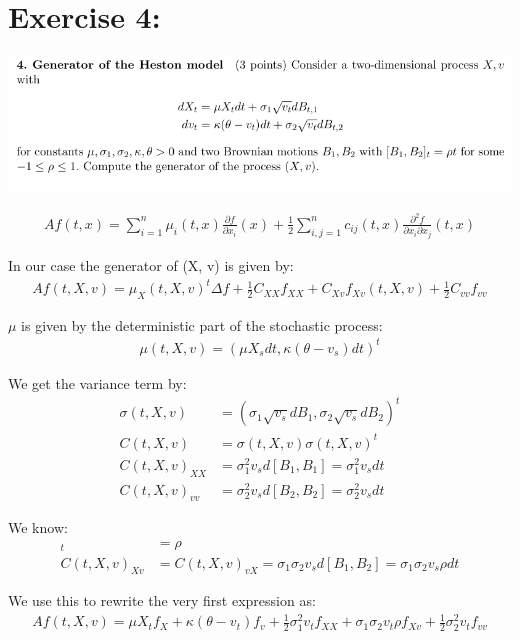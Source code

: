 \documentclass[document.tex]{subfiles}
\begin{document}
\section*{Exercise 4:}


\includegraphics[width=\textwidth]{ex4.png}


\begin{align*}
Af(t,x)=\sum_{i=1}^{n} \mu_i(t,x) \frac{\partial f}{\partial x_i} (x) + \frac{1}{2} \sum_{i,j=1}^n c_{ij} (t,x) 
\frac{\partial^2 f}{\partial x_i \partial x_j} (t,x)
\end{align*}

In our case the generator of (X, v) is given by:
\begin{align*}
Af(t, X, v) = \mu_X(t, X, v)^t \Delta f + \frac{1}{2} C_{XX} f_{XX} + C_{Xv} f_{Xv}(t, X, v) + \frac{1}{2} C_{vv} f_{vv}
\end{align*}

$\mu$ is given by the deterministic part of the stochastic process:
\begin{align*}
\mu(t, X, v) = (\mu X_s dt, \kappa (\theta - v_s) dt)^t
\end{align*}


We get the variance term by:
\begin{align*}
\sigma(t, X, v) &= (\sigma_1 \sqrt{v_s} d B_1, \sigma_2 \sqrt{v_s} d B_2)^t \\
C(t, X, v) &= \sigma(t, X, v) \sigma(t, X, v)^t \\
C(t, X, v)_{XX} &= \sigma_1^2 v_s d [B_1, B_1] = \sigma_1^2 v_s d t \\
C(t, X, v)_{vv} &= \sigma_2^2 v_s d [B_2, B_2] = \sigma_2^2 v_s d t
\end{align*}

We know:
\begin{align*}
	[B_1, B_2]_t &= \rho \\
C(t, X, v)_{Xv} &= C(t, X, v)_{vX} = \sigma_1 \sigma_2 v_s d [B_1, B_2] = \sigma_1 \sigma_2 v_s \rho d t
\end{align*}

We use this to rewrite the very first expression as:
\begin{align}
Af(t, X, v) = \mu X_t f_X + \kappa (\theta - v_t) f_v + \frac{1}{2} \sigma_1^2 v_t f_{XX} + \sigma_1 \sigma_2 v_t \rho f_{Xv} + \frac{1}{2} \sigma_2^2 v_t f_{vv}
\end{align}
\end{document}
